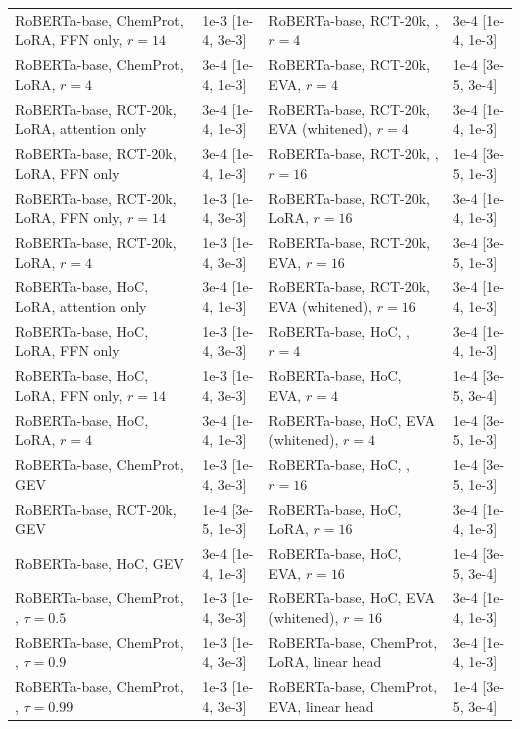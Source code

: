 \begin{table}[!ht]
\begin{tabular}{llll}
RoBERTa-base, ChemProt, LoRA, FFN only, $r{=}14$ & 1e-3 [1e-4, 3e-3] & RoBERTa-base, RCT-20k, \method{}, $r{=}4$ & 3e-4 [1e-4, 1e-3] \\
RoBERTa-base, ChemProt, LoRA, $r{=}4$ & 3e-4 [1e-4, 1e-3] & RoBERTa-base, RCT-20k, EVA, $r{=}4$ & 1e-4 [3e-5, 3e-4] \\
RoBERTa-base, RCT-20k, LoRA, attention only & 3e-4 [1e-4, 1e-3] & RoBERTa-base, RCT-20k, EVA (whitened), $r{=}4$ & 3e-4 [1e-4, 1e-3] \\
RoBERTa-base, RCT-20k, LoRA, FFN only & 3e-4 [1e-4, 1e-3] & RoBERTa-base, RCT-20k, \method{}, $r{=}16$ & 1e-4 [3e-5, 1e-3] \\
RoBERTa-base, RCT-20k, LoRA, FFN only, $r{=}14$ & 1e-3 [1e-4, 3e-3] & RoBERTa-base, RCT-20k, LoRA, $r{=}16$ & 3e-4 [1e-4, 1e-3] \\
RoBERTa-base, RCT-20k, LoRA, $r{=}4$ & 1e-3 [1e-4, 3e-3] & RoBERTa-base, RCT-20k, EVA, $r{=}16$ & 3e-4 [3e-5, 1e-3] \\
RoBERTa-base, HoC, LoRA, attention only & 3e-4 [1e-4, 1e-3] & RoBERTa-base, RCT-20k, EVA (whitened), $r{=}16$ & 3e-4 [1e-4, 1e-3] \\
RoBERTa-base, HoC, LoRA, FFN only & 1e-3 [1e-4, 3e-3] & RoBERTa-base, HoC, \method{}, $r{=}4$ & 3e-4 [1e-4, 1e-3] \\
RoBERTa-base, HoC, LoRA, FFN only, $r{=}14$ & 1e-3 [1e-4, 3e-3] & RoBERTa-base, HoC, EVA, $r{=}4$ & 1e-4 [3e-5, 3e-4] \\
RoBERTa-base, HoC, LoRA, $r{=}4$ & 3e-4 [1e-4, 1e-3] & RoBERTa-base, HoC, EVA (whitened), $r{=}4$ & 1e-4 [3e-5, 1e-3] \\
RoBERTa-base, ChemProt, GEV & 1e-3 [1e-4, 3e-3] & RoBERTa-base, HoC, \method{}, $r{=}16$ & 1e-4 [3e-5, 1e-3] \\
RoBERTa-base, RCT-20k, GEV & 1e-4 [3e-5, 1e-3] & RoBERTa-base, HoC, LoRA, $r{=}16$ & 3e-4 [1e-4, 1e-3] \\
RoBERTa-base, HoC, GEV & 3e-4 [1e-4, 1e-3] & RoBERTa-base, HoC, EVA, $r{=}16$ & 1e-4 [3e-5, 3e-4] \\
RoBERTa-base, ChemProt, \method{}, $\tau{=}0.5$ & 1e-3 [1e-4, 3e-3] & RoBERTa-base, HoC, EVA (whitened), $r{=}16$ & 3e-4 [1e-4, 1e-3] \\
RoBERTa-base, ChemProt, \method{}, $\tau{=}0.9$ & 1e-3 [1e-4, 3e-3] & RoBERTa-base, ChemProt, LoRA, linear head & 3e-4 [1e-4, 1e-3] \\
RoBERTa-base, ChemProt, \method{}, $\tau{=}0.99$ & 1e-3 [1e-4, 3e-3] & RoBERTa-base, ChemProt, EVA, linear head & 1e-4 [3e-5, 3e-4] \\

\end{tabular}
\end{table}
